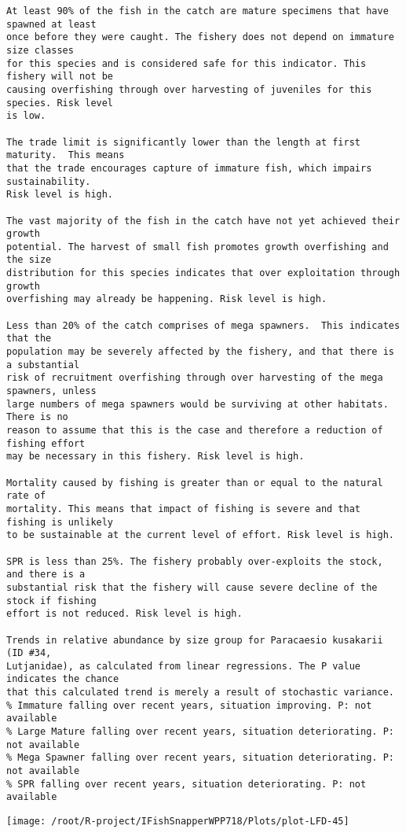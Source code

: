 \documentclass{report}\usepackage[]{graphicx}\usepackage[]{color}
\makeatletter
\def\maxwidth{ %
  \ifdim\Gin@nat@width>\linewidth
    \linewidth
  \else
    \Gin@nat@width
  \fi
}
\newenvironment{kframe}{%
 \def\at@end@of@kframe{}%
 \ifinner\ifhmode%
  \def\at@end@of@kframe{\end{minipage}}%
  \begin{minipage}{\columnwidth}%
 \fi\fi%
 \def\FrameCommand##1{\hskip\@totalleftmargin \hskip-\fboxsep
 \colorbox{shadecolor}{##1}\hskip-\fboxsep
     \hskip-\linewidth \hskip-\@totalleftmargin \hskip\columnwidth}%
 \MakeFramed {\advance\hsize-\width
   \@totalleftmargin\z@ \linewidth\hsize
   \@setminipage}}%
 {\par\unskip\endMakeFramed%
 \at@end@of@kframe}
\newenvironment{knitrout}{}{} %
\makeatother
\begin{document}
\begin{knitrout}
\begin{kframe}
\begin{verbatim}
At least 90% of the fish in the catch are mature specimens that have spawned at least
once before they were caught. The fishery does not depend on immature size classes
for this species and is considered safe for this indicator. This fishery will not be
causing overfishing through over harvesting of juveniles for this species. Risk level
is low.

The trade limit is significantly lower than the length at first maturity.  This means
that the trade encourages capture of immature fish, which impairs sustainability.
Risk level is high.

The vast majority of the fish in the catch have not yet achieved their growth
potential. The harvest of small fish promotes growth overfishing and the size
distribution for this species indicates that over exploitation through growth
overfishing may already be happening. Risk level is high.

Less than 20% of the catch comprises of mega spawners.  This indicates that the
population may be severely affected by the fishery, and that there is a substantial
risk of recruitment overfishing through over harvesting of the mega spawners, unless
large numbers of mega spawners would be surviving at other habitats. There is no
reason to assume that this is the case and therefore a reduction of fishing effort
may be necessary in this fishery. Risk level is high.
 
Mortality caused by fishing is greater than or equal to the natural rate of
mortality. This means that impact of fishing is severe and that fishing is unlikely
to be sustainable at the current level of effort. Risk level is high.
 
SPR is less than 25%. The fishery probably over-exploits the stock, and there is a
substantial risk that the fishery will cause severe decline of the stock if fishing
effort is not reduced. Risk level is high.
 
Trends in relative abundance by size group for Paracaesio kusakarii (ID #34,
Lutjanidae), as calculated from linear regressions. The P value indicates the chance
that this calculated trend is merely a result of stochastic variance.
% Immature falling over recent years, situation improving. P: not available
% Large Mature falling over recent years, situation deteriorating. P: not available
% Mega Spawner falling over recent years, situation deteriorating. P: not available
% SPR falling over recent years, situation deteriorating. P: not available
\end{verbatim}
\end{kframe}
\texttt{[image: /root/R-project/IFishSnapperWPP718/Plots/plot-LFD-45]} 


\end{knitrout}
\end{document}
